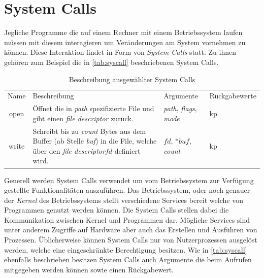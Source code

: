     \section{System Calls}\label{sec:syscalls}
        Jegliche Programme die auf einem Rechner mit einem Betriebssystem laufen müssen mit diesem interagieren um Veränderungen am System vornehmen zu können.
        Diese Interaktion findet in Form von \textit{System Calls}  statt.
        Zu ihnen gehören zum Beispiel die in \autoref{tab:syscall} beschriebenen System Calls.

        \begin{table}[ht]
            \small
            \label{tab:syscall}
            \centering
            \begin{tabular}{cp{6cm}p{3cm}p{3cm}}
                \hline
                \rowcolor{Gray!36}
                \multicolumn{4}{c}{System Calls}\\
                \hline
                Name & Beschreibung & Argumente & Rückgabewerte\\
                \hline
                \hline
                \rowcolor{Gray!16}
                open& Öffnet die in \textit{path} spezifizierte File und gibt einen \textit{file descriptor} zurück.& \textit{path}, \textit{flags}, \textit{mode} & kp\\
                write& Schreibt bis zu \textit{count} Bytes aus dem Buffer (ab Stelle \textit{buf}) in die File, welche über den \textit{file descriptor}$fd$ definiert wird. & $fd$, $*buf$, \textit{count} & kp\\
                \hline
            \end{tabular}
            \caption{Beschreibung ausgewählter System Calls}
        \end{table}

        Generell werden System Calls verwendet um vom Betriebssystem zur Verfügung gestellte Funktionalitäten auszuführen.
        Das Betriebssystem, oder noch genauer der \textit{Kernel}  des Betriebssystems stellt verschiedene Services bereit welche von Programmen genutzt werden können. 
        Die System Calls stellen dabei die Kommunikation zwischen Kernel und Programmen dar.
        Mögliche Services sind unter anderem Zugriffe auf Hardware aber auch das Erstellen und Ausführen von Prozessen.
        Üblicherweise können System Calls nur von Nutzerprozessen ausgelöst werden, welche eine eingeschränkte Berechtigung besitzen.
        Wie in \autoref{tab:syscall} ebenfalls beschrieben besitzen System Calls auch Argumente die beim Aufrufen mitgegeben werden können sowie einen Rückgabewert.

